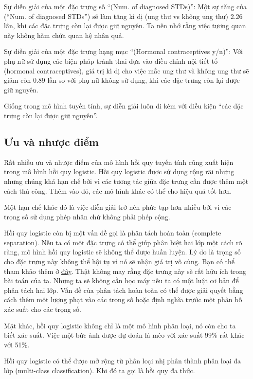 Sự diễn giải của một đặc trưng số ``(Num. of diagnosed STDs)'': Một sự tăng của (``Num. of diagnosed STDs'') sẽ làm tăng kì dị (ung thư vs không ung thư) 2.26 lần, khi các đặc trưng còn lại được giữ nguyên. Ta nên nhớ rằng việc tương quan này không hàm chứa quan hệ nhân quả.

Sự diễn giải của một đặc trưng hạng mục ``(Hormonal contraceptives y/n)'': Với phụ nữ sử dụng các biện pháp tránh thai dựa vào điều chỉnh nội tiết tố (hormonal contraceptives), giá trị kì dị cho việc mắc ung thư và không ung thư sẽ giảm còn 0.89 lần so với phụ nữ không sử dụng, khi các đặc trưng còn lại được giữ nguyên.

Giống trong mô hình tuyến tính, sự diễn giải luôn đi kèm với điều kiện ``các đặc trưng còn lại được giữ nguyên''.

\subsection{Ưu và nhược điểm}

Rất nhiều ưu và nhược điểm của mô hình hồi quy tuyến tính cũng xuất hiện trong mô hình hồi quy logistic. Hồi quy logistic được sử dụng rộng rãi nhưng nhưng chúng khá hạn chế bởi vì các tương tác giữa đặc trưng cần được thêm một cách thủ công. Thêm vào đó, các mô hình khác có thể cho hiệu quả tốt hơn.

Một hạn chế khác đó là việc diễn giải trở nên phức tạp hơn nhiều bởi vì các trọng số sử dụng phép nhân chứ không phải phép cộng.

Hồi quy logistic còn bị một vấn đề gọi là phân tách hoàn toàn (complete separation). Nếu ta có một đặc trưng có thể giúp phân biệt hai lớp một cách rõ ràng, mô hình hồi quy logistic sẽ không thể được huấn luyện. Lý do là trọng số cho đặc trưng này không thể hội tụ vì nó sẽ nhận giá trị vô cùng. Bạn có thể tham khảo thêm ở \href{https://github.com/luulinh90s/InterpretableMLBook-Vietnamese/issues/8}{đây}. Thật không may rằng đặc trưng này sẽ rất hữu ích trong bài toán của ta. Nhưng ta sẽ không cần học máy nếu ta có một luật cơ bản để phân tách hai lớp. Vấn đề của phân tách hoàn toàn có thể được giải quyết bằng cách thêm một lượng phạt vào các trọng số hoặc định nghĩa trước một phân bố xác suất cho các trọng số.

Mặt khác, hồi quy logistic không chỉ là một mô hình phân loại, nó còn cho ta biết xác suất. Việc một bức ảnh được dự đoán là mèo với xác suất 99\% rất khác với 51\%.

Hồi quy logistic có thể được mở rộng từ phân loại nhị phân thành phân loại đa lớp (multi-class classification). Khi đó ta gọi là hồi quy đa thức. 

